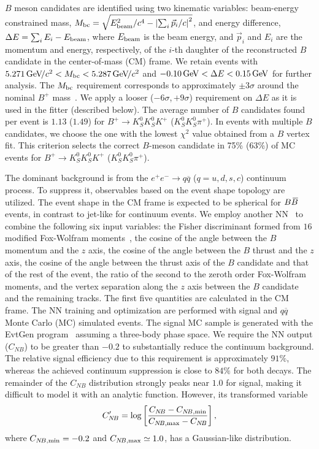 \documentclass[aps,prl,preprint,tightenlines,superscriptaddress,,amsmath,byrevtex]{revtex4}
\def\qqbar  {\ensuremath{q\overline q}\xspace}
\def\pip    {\ensuremath{\pi^+}\xspace}
\def\Kp     {\ensuremath{K^+}\xspace}
\def\KS     {\ensuremath{K^0_{\scriptscriptstyle S}}\xspace}
\def\Bbar   {\kern 0.18em\overline{\kern -0.18em B}{}\xspace}
\def\BB     {\ensuremath{B\Bbar}\xspace}
\def\Bu     {\ensuremath{B^+}\xspace}
\def\Bp     {\ensuremath{\Bu}\xspace}
\def\mbc    {\mbox{$M_{\rm bc}$}\xspace}
\def\DeltaE {\mbox{$\Delta E$}\xspace}
\def\to{\ensuremath{\rightarrow}\xspace}
\def\nb    {\ensuremath{C_{N\!B}}\xspace}
\def\nbprim{\ensuremath{C'_{N\!B}}\xspace}
\def\nbmin {\ensuremath{C_{N\!B,{\rm min}}}\xspace}
\def\nbmax {\ensuremath{C_{N\!B,{\rm max}}}\xspace}
\newcommand{\gev}{\ensuremath{\mathrm{\,Ge\kern -0.1em V}}\xspace}
\newcommand{\gevcc}{\ensuremath{{\mathrm{\,Ge\kern -0.1em V\!/}c^2}}\xspace}
\begin{document}
$B$ meson candidates are identified using two kinematic variables:
beam-energy constrained mass, $\mbc=\sqrt{E^2_{\rm beam}/c^{4}-\left|\sum_{i}
\vec{p}_i/c\right|^2}$, and energy difference, $\DeltaE=\sum_{i}E_{i}-
E_{\rm beam}$, where $E_{\rm beam}$ is the beam energy, and $\vec{p}_i$
and $E_i$ are the momentum and energy, respectively, of the $i$-th
daughter of the reconstructed $B$ candidate in the center-of-mass (CM) frame.
We retain events with $5.271 \gevcc<\mbc<5.287\gevcc$ and $-0.10\gev<\DeltaE<0.15\gev$ 
for further analysis. The $\mbc$ requirement corresponds to approximately 
$\pm 3\sigma$ around the nominal $\Bp$ mass~\cite{PDG}. We apply a 
looser ($-6\sigma$,\,$+9\sigma$) requirement on $\DeltaE$ as it 
is used in the fitter (described below). The average number of $B$ 
candidates found per event is $1.13$ ($1.49$) for $\Bp\to\KS\KS\Kp$ 
($\KS\KS\pip$). In events with multiple $B$ candidates, we choose 
the one with the lowest $\chi^2$ value obtained from a $B$ vertex fit.
This criterion selects the correct $B$-meson candidate in
75\% (63\%) of MC events for $\Bp\to\KS\KS\Kp$ ($\KS\KS\pip$).

The dominant background is from the $e^+e^-\to\qqbar$ ($q=u,d,s,c$)
continuum process. To suppress it, observables based on
the event shape topology are utilized. The event shape in the CM frame is
expected to be spherical for $\BB$ events,  in contrast to jet-like for continuum
events. We employ another NN~\cite{neurobayes} to combine the
following six input variables: the Fisher discriminant formed from
$16$ modified Fox-Wolfram moments~\cite{KSFW}, the cosine of the angle
between the $B$ momentum and the $z$ axis, the cosine of the angle between
the $B$ thrust and the $z$ axis, the cosine of the angle between the
thrust axis of the $B$ candidate and that of the rest of the event, the
ratio of the second to the zeroth order Fox-Wolfram moments, and the vertex separation along the
$z$ axis between the $B$ candidate and the remaining tracks. The first five quantities are calculated in the CM frame. The NN training and optimization are performed with signal and
$\qqbar$ Monte Carlo (MC) simulated events. The signal MC sample is
generated with the {\textsc EvtGen} program~\cite{evtgen} assuming a
three-body phase space. We require the NN output ($\nb$)
to be greater than $-0.2$ to substantially reduce the continuum
background. The relative signal efficiency due to this requirement is
approximately $91\%$, whereas the achieved continuum suppression is
close to $84\%$ for both decays. The remainder of the $\nb$ distribution strongly peaks
near $1.0$ for signal, making it difficult to model it with
an analytic function. However, its transformed variable
\begin{eqnarray}
\nbprim=\log\left[\frac{\nb-\nbmin}{\nbmax-\nb}\right], 
\end{eqnarray}
where $\nbmin=-0.2$ and $\nbmax\simeq 1.0$, has a Gaussian-like distribution.
\end{document}

